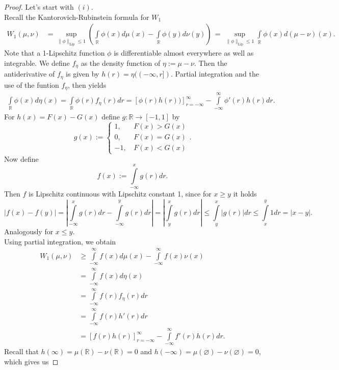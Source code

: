 \documentclass[11pt,a4paper]{article}
\begin{document}
\begin{proof}
Let's start with $(i).$\\ Recall the Kantorovich-Rubinstein formula for $W_1$ 
\begin{align*}
W_1(\mu,\nu) &= \sup\limits_{\|\phi\|_{\text{Lip}}\leq{}1}\left(\int\limits_{\mathbb{R}}\phi(x)d\mu(x) - \int\limits_{\mathbb{R}}\phi(y)d\nu(y)\right)\,=\,\sup\limits_{\|\phi\|_{\text{Lip}}\leq{}1}\int\limits_{\mathbb{R}}\phi(x)d(\mu-\nu)(x).
\end{align*}
Note that a 1-Lipschitz function $\phi$ is differentiable almost everywhere as well as integrable. We define $f_{\eta}$ as the density function of $\eta:=\mu-\nu$. Then the antiderivative of $f_{\eta}$ is given by $h(r)=\eta((-\infty,r])$. Partial integration and the use of the funtion $f_\eta$, then yields
\begin{align*}
\int\limits_{\mathbb{R}}\phi(x)d\eta(x) = \int\limits_{\mathbb{R}}\phi(r)f_\eta(r)dr = \left[\phi(r)h(r))\right]_{r = -\infty}^{\infty} - \int\limits_{-\infty}^{\infty}\phi'(r)h(r)dr.
\end{align*}
For $h(x)=F(x)-G(x)$ define $g:\mathbb{R}\rightarrow{}[-1,1]$ by
\[
g(x):=\begin{cases}
1,\, & F(x)>G(x)\\
0,\,& F(x)=G(x) \\
-1,\, & F(x)<G(x) 
\end{cases}.
\]
Now define 
\[
f(x):=\int\limits_{-\infty}^{x}g(r)dr.
\] 
Then $f$ is Lipschitz continuous with Lipschitz constant 1, since for $x\geq{}y$ it holds
\[
\left|f(x)-f(y)\right|=\left|\int\limits_{-\infty}^{x}g(r)dr - \int\limits_{-\infty}^{y}g(r)dr\right|=\left|\int\limits_{y}^{x}g(r)dr\right|\leq\int\limits_{y}^{x}|g(r)|dr\leq\int\limits_{x}^{y}1dr=|x-y|.
\]
Analogously for $x\leq{}y$. \vspace{1em}\\
Using partial integration, we obtain
\begin{align*}
W_1(\mu,\nu)&\geq{}\int\limits_{-\infty}^{\infty}f(x)d\mu(x) - \int\limits_{-\infty}^{\infty}f(x)\nu(x) \\& = \int\limits_{-\infty}^{\infty}f(x)d\eta(x) \\&= \int\limits_{-\infty}^{\infty}f(r)f_{\eta}(r)dr \\&= \int\limits_{-\infty}^{\infty}f(r)h'(r)dr \\& = \left[f(r)h(r)\right]_{r = -\infty}^{\infty} - \int\limits_{-\infty}^{\infty}f'(r)h(r)dr.
\end{align*}
Recall that $h(\infty)=\mu(\mathbb{R})-\nu(\mathbb{R})=0$ and $h(-\infty)=\mu(\varnothing)-\nu(\varnothing)=0$, which gives us

\end{proof}
\end{document}
